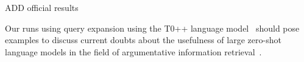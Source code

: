 {\color{red} ADD official results}

Our runs using query expansion using the T0++ language model~\cite{SanhWRBSACSLRDBXTSSKCNDCJWMSYPBWNRSSFFTBGBWR2021} should pose examples to discuss current doubts about the usefulness of large zero-shot language models in the field of argumentative information retrieval~\cite{ShahB2022}.
